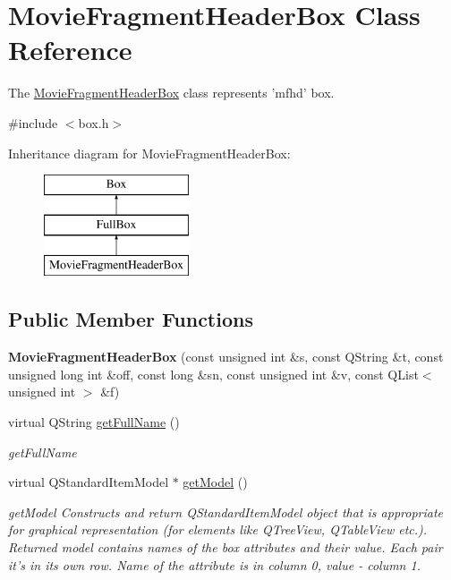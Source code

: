 \hypertarget{class_movie_fragment_header_box}{\section{Movie\-Fragment\-Header\-Box Class Reference}
\label{class_movie_fragment_header_box}
}


The \hyperlink{class_movie_fragment_header_box}{Movie\-Fragment\-Header\-Box} class represents 'mfhd' box.  




{\ttfamily \#include $<$box.\-h$>$}

Inheritance diagram for Movie\-Fragment\-Header\-Box\-:\begin{figure}[H]
\begin{center}
\leavevmode
\includegraphics[height=3.000000cm]{class_movie_fragment_header_box}
\end{center}
\end{figure}
\subsection*{Public Member Functions}
\begin{DoxyCompactItemize}
\item 
\hypertarget{class_movie_fragment_header_box_acf18d33447c0444f44dbfddb4b626d57}{{\bfseries Movie\-Fragment\-Header\-Box} (const unsigned int \&s, const Q\-String \&t, const unsigned long int \&off, const long \&sn, const unsigned int \&v, const Q\-List$<$ unsigned int $>$ \&f)}\label{class_movie_fragment_header_box_acf18d33447c0444f44dbfddb4b626d57}

\item 
virtual Q\-String \hyperlink{class_movie_fragment_header_box_a2a175cae00c09667bb8553e8e4ab7b16}{get\-Full\-Name} ()
\begin{DoxyCompactList}\small\item\em get\-Full\-Name \end{DoxyCompactList}\item 
virtual Q\-Standard\-Item\-Model $\ast$ \hyperlink{class_movie_fragment_header_box_a768488b5d695c2ac834a041165a9be82}{get\-Model} ()
\begin{DoxyCompactList}\small\item\em get\-Model Constructs and return Q\-Standard\-Item\-Model object that is appropriate for graphical representation (for elements like Q\-Tree\-View, Q\-Table\-View etc.). Returned model contains names of the box attributes and their value. Each pair it's in its own row. Name of the attribute is in column 0, value -\/ column 1. \end{DoxyCompactList}\end{DoxyCompactItemize}
